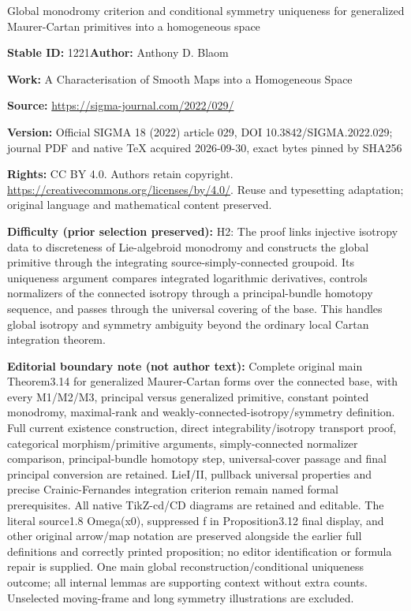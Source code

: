 \documentclass[11pt]{article}
\numberwithin{equation}{section}
\numberwithin{equation}{section}
\begin{document}
\begin{center}\Large Global monodromy criterion and conditional symmetry uniqueness for generalized Maurer-Cartan primitives into a homogeneous space\end{center}
\noindent\textbf{Stable ID:} 1221\quad\textbf{Author:} Anthony D. Blaom\par
\noindent\textbf{Work:} A Characterisation of Smooth Maps into a Homogeneous Space\par
\noindent\textbf{Source:} \url{https://sigma-journal.com/2022/029/}\par
\noindent\textbf{Version:} Official SIGMA 18 (2022) article 029, DOI 10.3842/SIGMA.2022.029; journal PDF and native TeX acquired 2026-09-30, exact bytes pinned by SHA256\par
\noindent\textbf{Rights:} CC BY 4.0. Authors retain copyright. \url{https://creativecommons.org/licenses/by/4.0/}. Reuse and typesetting adaptation; original language and mathematical content preserved.\par
\noindent\textbf{Difficulty (prior selection preserved):} {\CJKfont H2: The proof links injective isotropy data to discreteness of Lie-algebroid monodromy and constructs the global primitive through the integrating source-simply-connected groupoid. Its uniqueness argument compares integrated logarithmic derivatives, controls normalizers of the connected isotropy through a principal-bundle homotopy sequence, and passes through the universal covering of the base. This handles global isotropy and symmetry ambiguity beyond the ordinary local Cartan integration theorem.}\par
\medskip\noindent\textbf{Editorial boundary note (not author text):} Complete original main Theorem3.14 for generalized Maurer-Cartan forms over the connected base, with every M1/M2/M3, principal versus generalized primitive, constant pointed monodromy, maximal-rank and weakly-connected-isotropy/symmetry definition. Full current existence construction, direct integrability/isotropy transport proof, categorical morphism/primitive arguments, simply-connected normalizer comparison, principal-bundle homotopy step, universal-cover passage and final principal conversion are retained. LieI/II, pullback universal properties and precise Crainic-Fernandes integration criterion remain named formal prerequisites. All native TikZ-cd/CD diagrams are retained and editable. The literal source1.8 Omega(x0), suppressed f in Proposition3.12 final display, and other original arrow/map notation are preserved alongside the earlier full definitions and correctly printed proposition; no editor identification or formula repair is supplied. One main global reconstruction/conditional uniqueness outcome; all internal lemmas are supporting context without extra counts. Unselected moving-frame and long symmetry illustrations are excluded.\par
\end{document}
